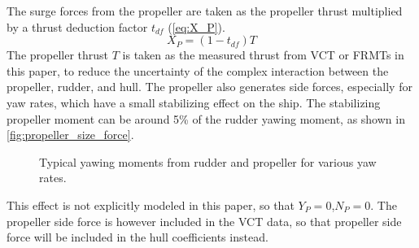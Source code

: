 The surge forces from the propeller are taken as the propeller thrust multiplied by a thrust deduction factor $t_{df}$ (\autoref{eq:X_P}).
\begin{equation}
    \label{eq:X_P}
    X_P = (1-t_{df})T
\end{equation}
The propeller thrust $T$ is taken as the measured thrust from VCT or FRMTs in this paper, to reduce the uncertainty of the complex interaction between the propeller, rudder, and hull. The propeller also generates side forces, especially for yaw rates, which have a small stabilizing effect on the ship. The stabilizing propeller moment can be around 5\% of the rudder yawing moment, as shown in \autoref{fig:propeller_size_force}.
\begin{figure}[h]
    \centering
    
    \caption{Typical yawing moments from rudder and propeller for various yaw rates.}
    \label{fig:propeller_size_force}
\end{figure}
This effect is not explicitly modeled in this paper, so that $Y_P=0$,$N_P=0$. The propeller side force is however included in the VCT data, so that propeller side force will be included in the hull coefficients instead.
